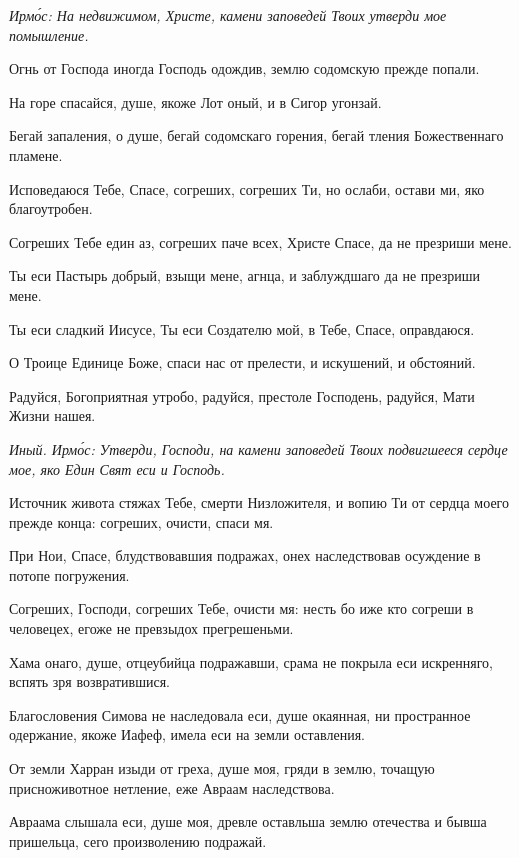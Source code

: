 
\itshape Ирм\'{о}с\normalfont{}: На недвижимом, Христе, камени заповедей Твоих утверди мое помышление.

Огнь от Господа иногда Господь одождив, землю содомскую прежде попали.

На горе спасайся, душе, якоже Лот оный, и в Сигор угонзай.

Бегай запаления, о душе, бегай содомскаго горения, бегай тления Божественнаго пламене.

Исповедаюся Тебе, Спасе, согреших, согреших Ти, но ослаби, остави ми, яко благоутробен.

Согреших Тебе един аз, согреших паче всех, Христе Спасе, да не презриши мене.

Ты еси Пастырь добрый, взыщи мене, агнца, и заблуждшаго да не презриши мене.

Ты еси сладкий Иисусе, Ты еси Создателю мой, в Тебе, Спасе, оправдаюся.


О Троице Единице Боже, спаси нас от прелести, и искушений, и обстояний.


Радуйся, Богоприятная утробо, радуйся, престоле Господень, радуйся, Мати Жизни нашея.

\itshape Иный. Ирм\'{о}с\normalfont{}: Утверди, Господи, на камени заповедей Твоих подвигшееся сердце мое, яко Един Свят еси и Господь.

Источник живота стяжах Тебе, смерти Низложителя, и вопию Ти от сердца моего прежде конца: согреших, очисти, спаси мя.

При Нои, Спасе, блудствовавшия подражах, онех наследствовав осуждение в потопе погружения.

Согреших, Господи, согреших Тебе, очисти мя: несть бо иже кто согреши в человецех, егоже не превзыдох прегрешеньми.

Хама онаго, душе, отцеубийца подражавши, срама не покрыла еси искренняго, вспять зря возвратившися.

Благословения Симова не наследовала еси, душе окаянная, ни пространное одержание, якоже Иафеф, имела еси на земли оставления.

От земли Харран изыди от греха, душе моя, гряди в землю, точащую присноживотное нетление, еже Авраам наследствова.

Авраама слышала еси, душе моя, древле оставльша землю отечества и бывша пришельца, сего произволению подражай.

